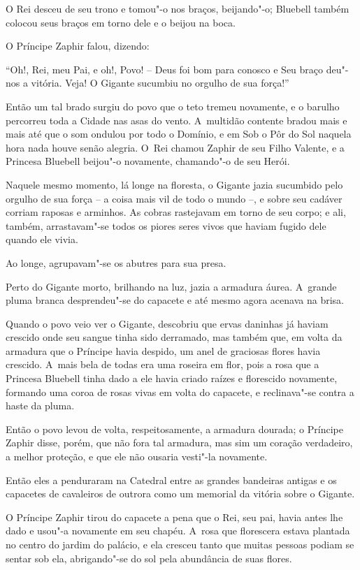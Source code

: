 O Rei desceu de seu trono e tomou"-o nos braços, beijando"-o; Bluebell
também colocou seus braços em torno dele e o beijou na boca.

O Príncipe Zaphir falou, dizendo:

``Oh!, Rei, meu Pai, e oh!, Povo! -- Deus foi bom para conosco e Seu
braço deu"-nos a vitória. Veja! O Gigante sucumbiu no orgulho de sua
força!''

Então um tal brado surgiu do povo que o teto tremeu novamente, e o
barulho percorreu toda a Cidade nas asas do vento. A~multidão contente
bradou mais e mais até que o som ondulou por todo o Domínio, e em Sob o
Pôr do Sol naquela hora nada houve senão alegria. O~Rei chamou Zaphir de
seu Filho Valente, e a Princesa Bluebell beijou"-o novamente, chamando"-o
de seu Herói.

Naquele mesmo momento, lá longe na floresta, o Gigante jazia sucumbido
pelo orgulho de sua força -- a coisa mais vil de todo o mundo --, e
sobre seu cadáver corriam raposas e arminhos. As cobras rastejavam em
torno de seu corpo; e ali, também, arrastavam"-se todos os piores seres
vivos que haviam fugido dele quando ele vivia.

Ao longe, agrupavam"-se os abutres para sua presa.

Perto do Gigante morto, brilhando na luz, jazia a armadura áurea. A~grande pluma branca desprendeu"-se do capacete e até mesmo agora acenava
na brisa.

Quando o povo veio ver o Gigante, descobriu que ervas daninhas já haviam
crescido onde seu sangue tinha sido derramado, mas também que, em volta
da armadura que o Príncipe havia despido, um anel de graciosas flores
havia crescido. A~mais bela de todas era uma roseira em flor, pois a
rosa que a Princesa Bluebell tinha dado a ele havia criado raízes e
florescido novamente, formando uma coroa de rosas vivas em volta do
capacete, e reclinava"-se contra a haste da pluma.

Então o povo levou de volta, respeitosamente, a armadura dourada; o
Príncipe Zaphir disse, porém, que não fora tal armadura, mas sim um
coração verdadeiro, a melhor proteção, e que ele não ousaria vesti"-la
novamente.

Então eles a penduraram na Catedral entre as grandes bandeiras antigas e
os capacetes de cavaleiros de outrora como um memorial da vitória sobre
o Gigante.

O Príncipe Zaphir tirou do capacete a pena que o Rei, seu pai, havia
antes lhe dado e usou"-a novamente em seu chapéu. A~rosa que florescera
estava plantada no centro do jardim do palácio, e ela cresceu tanto que
muitas pessoas podiam se sentar sob ela, abrigando"-se do sol pela
abundância de suas flores.

